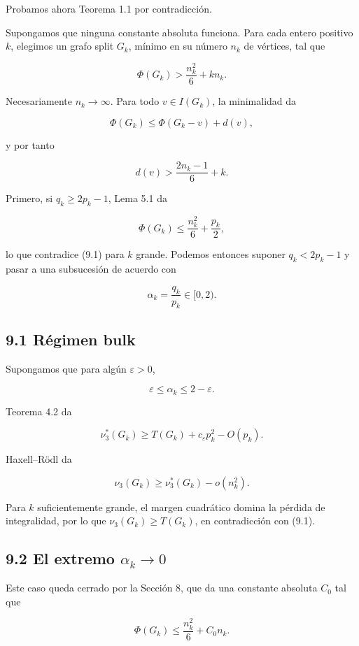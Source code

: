 \documentclass[
  11pt,
]{article}
\begin{document}
Probamos ahora Teorema 1.1 por contradicción.

Supongamos que ninguna constante absoluta funciona. Para cada entero positivo \(k\), elegimos un grafo split \(G_k\), mínimo en su número \(n_k\) de vértices, tal que

\[
\Phi(G_k)
>
\frac{n_k^2}{6}+kn_k.
\tag{9.1}
\]

Necesariamente \(n_k\to\infty\). Para todo \(v\in I(G_k)\), la minimalidad da

\[
\Phi(G_k)
\le
\Phi(G_k-v)+d(v),
\]

y por tanto

\[
\boxed{
d(v)>
\frac{2n_k-1}{6}+k.
}
\tag{9.2}
\]

Primero, si \(q_k\ge2p_k-1\), Lema 5.1 da

\[
\Phi(G_k)
\le
\frac{n_k^2}{6}+\frac{p_k}{2},
\]

lo que contradice (9.1) para \(k\) grande. Podemos entonces suponer \(q_k<2p_k-1\) y pasar a una subsucesión de acuerdo con

\[
\alpha_k=\frac{q_k}{p_k}\in[0,2).
\]

\subsection{9.1 Régimen bulk}\label{ruxe9gimen-bulk}

Supongamos que para algún \(\varepsilon>0\),

\[
\varepsilon\le\alpha_k\le2-\varepsilon.
\]

Teorema 4.2 da

\[
\nu_3^*(G_k)
\ge
T(G_k)+c_\varepsilon p_k^2-O(p_k).
\]

Haxell--Rödl da

\[
\nu_3(G_k)
\ge
\nu_3^*(G_k)-o(n_k^2).
\]

Para \(k\) suficientemente grande, el margen cuadrático domina la pérdida de integralidad, por lo que \(\nu_3(G_k)\ge T(G_k)\), en contradicción con (9.1).

\subsection{\texorpdfstring{9.2 El extremo \(\alpha_k\to0\)}{9.2 El extremo \textbackslash alpha\_k\textbackslash to0}}\label{el-extremo-alpha_kto0}

Este caso queda cerrado por la Sección 8, que da una constante absoluta \(C_0\) tal que

\[
\Phi(G_k)
\le
\frac{n_k^2}{6}+C_0n_k.
\]
\end{document}
